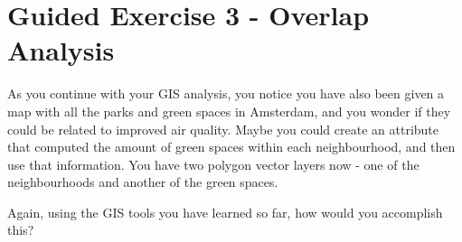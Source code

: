\documentclass[
  letterpaper,
  DIV=11,
  numbers=noendperiod]{scrreprt}
\begin{document}
\section{Guided Exercise 3 - Overlap
Analysis}\label{guided-exercise-3---overlap-analysis}

As you continue with your GIS analysis, you notice you have also been
given a map with all the parks and green spaces in Amsterdam, and you
wonder if they could be related to improved air quality. Maybe you could
create an attribute that computed the amount of green spaces within each
neighbourhood, and then use that information. You have two polygon
vector layers now - one of the neighbourhoods and another of the green
spaces.

\begin{tcolorbox}[enhanced jigsaw, coltitle=black, toprule=.15mm, breakable, opacitybacktitle=0.6, left=2mm, colback=white, leftrule=.75mm, rightrule=.15mm, colbacktitle=quarto-callout-important-color!10!white, toptitle=1mm, titlerule=0mm, colframe=quarto-callout-important-color-frame, arc=.35mm, bottomtitle=1mm, opacityback=0, bottomrule=.15mm, title=\textcolor{quarto-callout-important-color}{\faExclamation}\hspace{0.5em}{Stop and Think}]

Again, using the GIS tools you have learned so far, how would you
accomplish this?

\end{tcolorbox}
\end{document}
